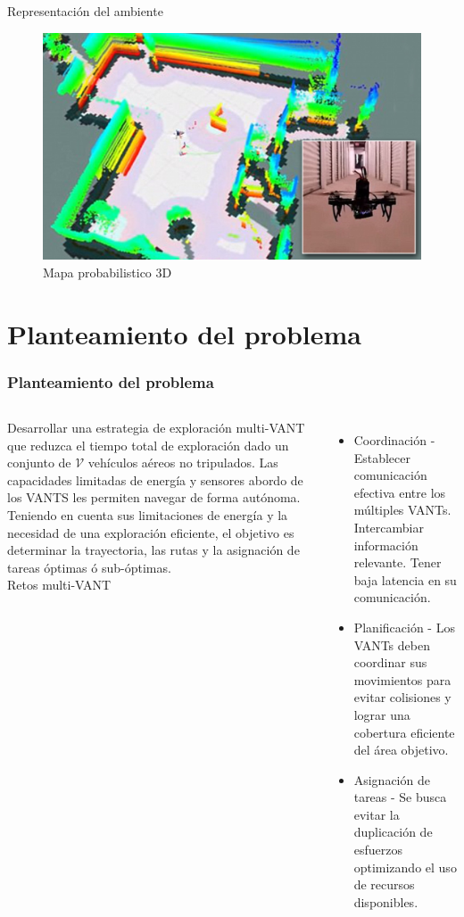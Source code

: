 \documentclass[
	12pt, %
	aspectratio=169, %
]{beamer}
\begin{document}
\begin{frame}{Representación del ambiente}
  \begin{figure}
    \centering
    \includegraphics[scale=0.15]{drone_mapping}
    \caption[Caption for LOF]{Mapa probabilistico 3D\protect\footnotemark}
  \end{figure}
  
\end{frame}

\section{Planteamiento del problema}

\begin{frame}
  \frametitle{Planteamiento del problema}
  \begin{columns}
    \justifying
    \small Desarrollar una estrategia de exploración multi-VANT que reduzca el tiempo total de exploración dado un conjunto de $\mathcal{V}$ vehículos aéreos no tripulados. Las capacidades limitadas de energía y sensores abordo de los VANTS les permiten navegar de forma autónoma. Teniendo en cuenta sus limitaciones de energía y la necesidad de una exploración eficiente, el objetivo es determinar la trayectoria, las rutas y la asignación de tareas óptimas ó sub-óptimas.
    \\
    \pause
    \centering
    \small Retos multi-VANT
    \begin{itemize}
    \small \item Coordinación - Establecer comunicación efectiva entre los múltiples VANTs. Intercambiar información relevante. Tener baja latencia en su comunicación.
    \small \item Planificación - Los VANTs deben coordinar sus movimientos para evitar colisiones y lograr una cobertura eficiente del área objetivo.
    \small \item Asignación de tareas - Se busca evitar la duplicación de esfuerzos optimizando el uso de recursos disponibles.
    \end{itemize}
  \end{columns}
\end{frame}
\end{document}
